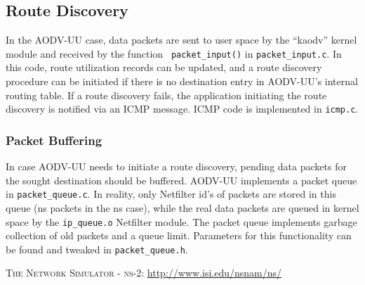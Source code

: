 \documentclass[swedish,10pt,twocolumn]{article}
\begin{document}
\subsection{Route Discovery}

In the AODV-UU case, data packets are sent to user space by the
``kaodv'' kernel module and received by the function {\tt
packet\_input()} in {\tt packet\_input.c}. In this code, route
utilization records can be updated, and a route discovery procedure
can be initiated if there is no destination entry in AODV-UU's
internal routing table. If a route discovery fails, the application
initiating the route discovery is notified via an ICMP message. ICMP
code is implemented in {\tt icmp.c}.

\subsubsection{Packet Buffering}

In case AODV-UU needs to initiate a route discovery, pending data
packets for the sought destination should be buffered. AODV-UU
implements a packet queue in {\tt packet\_queue.c}. In reality, only
Netfilter id's of packets are stored in this queue (ns packets in the
ns case), while the real data packets are queued in kernel space by
the {\tt ip\_queue.o} Netfilter module. The packet queue implements
garbage collection of old packets and a queue limit. Parameters for
this functionality can be found and tweaked in {\tt packet\_queue.h}.


\begin{thebibliography}
\small
\def\newblock{}

\textsc{The Network Simulator - ns-2:}
\newblock \url{http://www.isi.edu/nsnam/ns/}
\end{thebibliography}

\printindex
\end{document}
